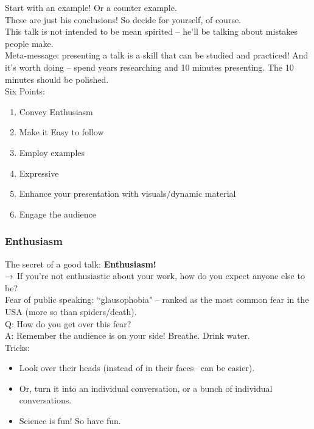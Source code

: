 Start with an example! Or a counter example. \\

These are just his conclusions! So decide for yourself, of course. \\

This talk is not intended to be mean spirited -- he'll be talking about mistakes people make. \\

Meta-message: presenting a talk is a skill that can be studied and practiced! And it's worth doing -- spend years researching and 10 minutes presenting. The 10 minutes should be polished. \\

Six Points:
\begin{enumerate}
    \item Convey Enthusiasm
    \item Make it Easy to follow
    \item Employ examples
    \item Expressive
    \item Enhance your presentation with visuals/dynamic material
    \item Engage the audience
\end{enumerate}


\subsubsection{Enthusiasm}
The secret of a good talk: {\bf Enthusiasm!}\\

$\rightarrow$ If you're not enthusiastic about your work, how do you expect anyone else to be? \\

Fear of public speaking: ``glausophobia" -- ranked as the most common fear in the USA (more so than spiders/death). \\

Q: How do you get over this fear? \\

A: Remember the audience is on your side! Breathe. Drink water. \\

Tricks:
\begin{itemize}
    \item Look over their heads (instead of in their faces-- can be easier).
    \item Or, turn it into an individual conversation, or a bunch of individual conversations.
    \item Science is fun! So have fun.
\end{itemize} 

